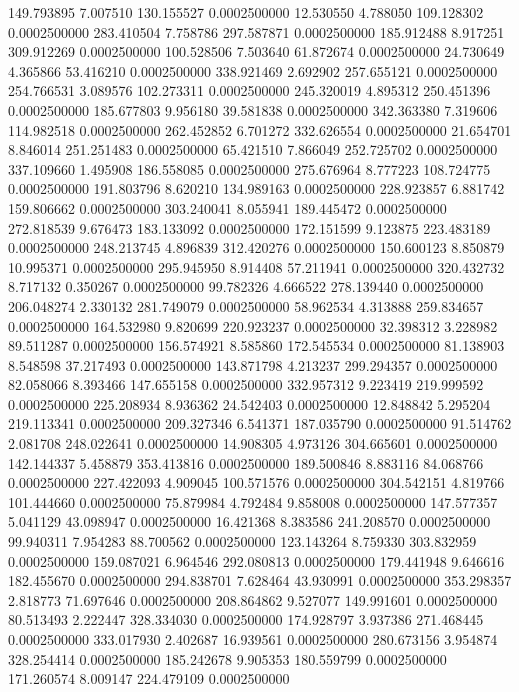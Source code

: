 149.793895 7.007510 130.155527 0.0002500000
12.530550 4.788050 109.128302 0.0002500000
283.410504 7.758786 297.587871 0.0002500000
185.912488 8.917251 309.912269 0.0002500000
100.528506 7.503640 61.872674 0.0002500000
24.730649 4.365866 53.416210 0.0002500000
338.921469 2.692902 257.655121 0.0002500000
254.766531 3.089576 102.273311 0.0002500000
245.320019 4.895312 250.451396 0.0002500000
185.677803 9.956180 39.581838 0.0002500000
342.363380 7.319606 114.982518 0.0002500000
262.452852 6.701272 332.626554 0.0002500000
21.654701 8.846014 251.251483 0.0002500000
65.421510 7.866049 252.725702 0.0002500000
337.109660 1.495908 186.558085 0.0002500000
275.676964 8.777223 108.724775 0.0002500000
191.803796 8.620210 134.989163 0.0002500000
228.923857 6.881742 159.806662 0.0002500000
303.240041 8.055941 189.445472 0.0002500000
272.818539 9.676473 183.133092 0.0002500000
172.151599 9.123875 223.483189 0.0002500000
248.213745 4.896839 312.420276 0.0002500000
150.600123 8.850879 10.995371 0.0002500000
295.945950 8.914408 57.211941 0.0002500000
320.432732 8.717132 0.350267 0.0002500000
99.782326 4.666522 278.139440 0.0002500000
206.048274 2.330132 281.749079 0.0002500000
58.962534 4.313888 259.834657 0.0002500000
164.532980 9.820699 220.923237 0.0002500000
32.398312 3.228982 89.511287 0.0002500000
156.574921 8.585860 172.545534 0.0002500000
81.138903 8.548598 37.217493 0.0002500000
143.871798 4.213237 299.294357 0.0002500000
82.058066 8.393466 147.655158 0.0002500000
332.957312 9.223419 219.999592 0.0002500000
225.208934 8.936362 24.542403 0.0002500000
12.848842 5.295204 219.113341 0.0002500000
209.327346 6.541371 187.035790 0.0002500000
91.514762 2.081708 248.022641 0.0002500000
14.908305 4.973126 304.665601 0.0002500000
142.144337 5.458879 353.413816 0.0002500000
189.500846 8.883116 84.068766 0.0002500000
227.422093 4.909045 100.571576 0.0002500000
304.542151 4.819766 101.444660 0.0002500000
75.879984 4.792484 9.858008 0.0002500000
147.577357 5.041129 43.098947 0.0002500000
16.421368 8.383586 241.208570 0.0002500000
99.940311 7.954283 88.700562 0.0002500000
123.143264 8.759330 303.832959 0.0002500000
159.087021 6.964546 292.080813 0.0002500000
179.441948 9.646616 182.455670 0.0002500000
294.838701 7.628464 43.930991 0.0002500000
353.298357 2.818773 71.697646 0.0002500000
208.864862 9.527077 149.991601 0.0002500000
80.513493 2.222447 328.334030 0.0002500000
174.928797 3.937386 271.468445 0.0002500000
333.017930 2.402687 16.939561 0.0002500000
280.673156 3.954874 328.254414 0.0002500000
185.242678 9.905353 180.559799 0.0002500000
171.260574 8.009147 224.479109 0.0002500000
